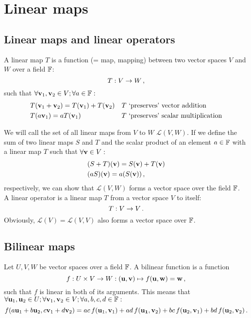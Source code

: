 \section{Linear maps}
    \subsection{Linear maps and linear operators}
        A linear map $T$ is a function (= map, mapping) between two vector spaces $V$ and $W$ over a field $\mathbb{F}$:
        \begin{equation}
            T: V \rightarrow W \thinspace ,
        \end{equation}
        such that $\forall \vb{v}_1, \vb{v}_2 \in V; \forall a \in \mathbb{F}:$
        \begin{align}
            &T(\vb{v}_1 + \vb{v}_2) = T(\vb{v}_1) + T(\vb{v}_2)     && \text{$T$ `preserves' vector addition} \\
            &T(a \vb{v}_1) = a T(\vb{v}_1)                          && \text{$T$ `preserves' scalar multiplication}
        \end{align}

        We will call the set of all linear maps from $V$ to $W$ $\mathcal{L}(V, W)$. If we define the sum of two linear maps $S$ and $T$ and the scalar product of an element $a \in \mathbb{F}$ with a linear map $T$ such that $\forall \vb{v} \in V:$
        \begin{align}
            &(S + T)(\vb{v}) = S(\vb{v}) + T(\vb{v}) \\
            &(aS)(\vb{v}) = a(S(\vb{v})) \thinspace ,
        \end{align}
        respectively, we can show that $\mathcal{L}(V, W)$ forms a vector space over the field $\mathbb{F}$. \\

        A linear operator is a linear map $T$ from a vector space $V$ to itself:
        \begin{equation}
            T: V \rightarrow V \thinspace .
        \end{equation}
        Obviously, $\mathcal{L}(V) = \mathcal{L}(V, V)$ also forms a vector space over $\mathbb{F}$.

    \subsection{Bilinear maps}
        Let $U, V, W$ be vector spaces over a field $\mathbb{F}$. A bilinear function is a function
        \begin{equation}
            f: U \times V \rightarrow W: (\vb{u}, \vb{v}) \mapsto f(\vb{u}, \vb{w}) = \vb{w} \thinspace ,
        \end{equation}
        such that $f$ is linear in both of its arguments. This means that $\forall \vb{u}_1, \vb{u}_2 \in U; \forall \vb{v}_1, \vb{v}_2 \in V; \forall a, b, c, d \in \mathbb{F}:$
        \begin{equation}
            f(a \vb{u}_1 + b \vb{u}_2, c \vb{v}_1 + d \vb{v}_2) = ac \thinspace f(\vb{u}_1, \vb{v}_1) + ad \thinspace f(\vb{u_1}, \vb{v}_2) + bc \thinspace f(\vb{u}_2, \vb{v}_1) + bd \thinspace f(\vb{u}_2, \vb{v}_2) \thinspace .
        \end{equation}

